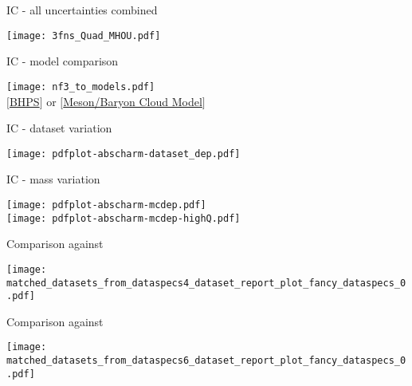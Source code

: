 \documentclass[10pt, usepdftitle=false]{beamer}
\providecommand{\iRef}[1]{{\color{mLightGreen}\small $[$#1$]$}}
\begin{document}
\begin{frame}{IC - all uncertainties combined}
	\begin{center}
		\texttt{[image: 3fns\_Quad\_MHOU.pdf]}
	\end{center}
\end{frame}
\begin{frame}{IC - model comparison}
	\begin{center}
		\texttt{[image: nf3\_to\_models.pdf]}\\
		\iRef{\href{https://doi.org/10.1016/0370-2693(80)90364-0}{BHPS}} or \iRef{\href{https://doi.org/10.1103/PhysRevD.89.074008}{Meson/Baryon Cloud Model}}
	\end{center}
\end{frame}
\begin{frame}{IC - dataset variation}
	\begin{center}
		\texttt{[image: pdfplot-abscharm-dataset\_dep.pdf]}
	\end{center}
\end{frame}
\begin{frame}{IC - mass variation}
	\begin{center}
		\texttt{[image: pdfplot-abscharm-mcdep.pdf]}\\%
		\texttt{[image: pdfplot-abscharm-mcdep-highQ.pdf]}
	\end{center}
\end{frame}

\begin{frame}{Comparison \yadism{} against \apfel{}}
	\begin{center}
		\texttt{[image: matched\_datasets\_from\_dataspecs4\_dataset\_report\_plot\_fancy\_dataspecs\_0.pdf]}
	\end{center}
\end{frame}
\begin{frame}{Comparison \yadism{} against \apfel{}}
	\begin{center}
		\texttt{[image: matched\_datasets\_from\_dataspecs6\_dataset\_report\_plot\_fancy\_dataspecs\_0.pdf]}
	\end{center}
\end{frame}
\end{document}
